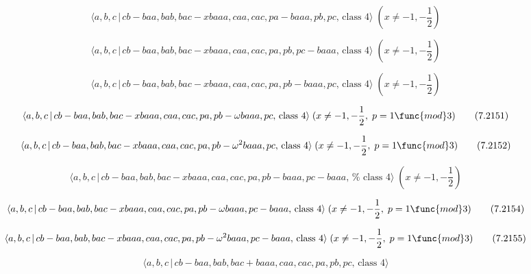 \documentclass[10pt]{article}
\begin{document}
\begin{equation}
\langle a,b,c\,|\,cb-baa,bab,bac-xbaaa,caa,cac,pa-baaa,pb,pc,\,\text{class }%
4\rangle \;(x\neq -1,-\frac{1}{2})  \tag{7.2148}
\end{equation}

\begin{equation}
\langle a,b,c\,|\,cb-baa,bab,bac-xbaaa,caa,cac,pa,pb,pc-baaa,\,\text{class }%
4\rangle \;(x\neq -1,-\frac{1}{2})  \tag{7.2149}
\end{equation}

\begin{equation}
\langle a,b,c\,|\,cb-baa,bab,bac-xbaaa,caa,cac,pa,pb-baaa,pc,\,\text{class }%
4\rangle \;(x\neq -1,-\frac{1}{2})  \tag{7.2150}
\end{equation}

\begin{equation}
\langle a,b,c\,|\,cb-baa,bab,bac-xbaaa,caa,cac,pa,pb-\omega baaa,pc,\,\text{%
class }4\rangle \;(x\neq -1,-\frac{1}{2},\;p=1\func{mod}3)  \tag{7.2151}
\end{equation}

\begin{equation}
\langle a,b,c\,|\,cb-baa,bab,bac-xbaaa,caa,cac,pa,pb-\omega ^{2}baaa,pc,\,%
\text{class }4\rangle \;(x\neq -1,-\frac{1}{2},\;p=1\func{mod}3) 
\tag{7.2152}
\end{equation}

\begin{equation}
\langle a,b,c\,|\,cb-baa,bab,bac-xbaaa,caa,cac,pa,pb-baaa,pc-baaa,\,\text{%
class }4\rangle \;(x\neq -1,-\frac{1}{2})  \tag{7.2153}
\end{equation}

\begin{equation}
\langle a,b,c\,|\,cb-baa,bab,bac-xbaaa,caa,cac,pa,pb-\omega baaa,pc-baaa,\,%
\text{class }4\rangle \;(x\neq -1,-\frac{1}{2},\;p=1\func{mod}3) 
\tag{7.2154}
\end{equation}

\begin{equation}
\langle a,b,c\,|\,cb-baa,bab,bac-xbaaa,caa,cac,pa,pb-\omega
^{2}baaa,pc-baaa,\,\text{class }4\rangle \;(x\neq -1,-\frac{1}{2},\;p=1\func{%
mod}3)  \tag{7.2155}
\end{equation}

\begin{equation}
\langle a,b,c\,|\,cb-baa,bab,bac+baaa,caa,cac,pa,pb,pc,\,\text{class }%
4\rangle  \tag{7.2156}
\end{equation}
\end{document}
